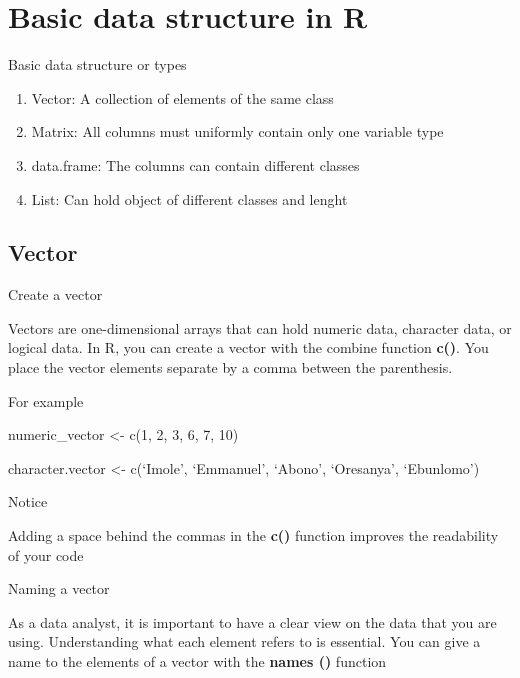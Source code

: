 \documentclass[
  ignorenonframetext,
]{beamer}
\providecommand{\tightlist}{%
  \setlength{\itemsep}{0pt}\setlength{\parskip}{0pt}}
\begin{document}
\section{Basic data structure in R}
\begin{frame}{Basic data structure or types}
\protect\hypertarget{basic-data-structure-or-types}{}

\begin{enumerate}
\tightlist
\item
  Vector: A collection of elements of the same class
\item
  Matrix: All columns must uniformly contain only one variable type
\item
  data.frame: The columns can contain different classes
\item
  List: Can hold object of different classes and lenght
\end{enumerate}

\end{frame}
\subsection{Vector}
\begin{frame}{Create a vector}
\protect\hypertarget{create-a-vector}{}

Vectors are one-dimensional arrays that can hold numeric data, character
data, or logical data. In R, you can create a vector with the combine
function \textbf{c()}. You place the vector elements separate by a comma
between the parenthesis.

\begin{block}{For example}

numeric\_vector \textless- c(1, 2, 3, 6, 7, 10)

character.vector \textless- c(`Imole', `Emmanuel', `Abono',
`Oresanya', `Ebunlomo')

\end{block}

\begin{block}{Notice}

Adding a space behind the commas in the \textbf{c()} function improves
the readability of your code

\end{block}

\end{frame}

\begin{frame}{Naming a vector}
\protect\hypertarget{naming-a-vector}{}

As a data analyst, it is important to have a clear view on the data that
you are using. Understanding what each element refers to is essential.
You can give a name to the elements of a vector with the
\textbf{names ()} function

\end{frame}
\end{document}
